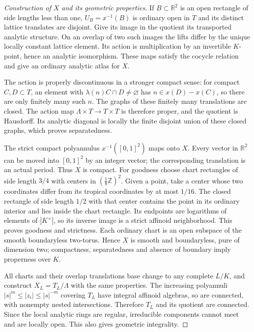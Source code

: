 \documentclass[11pt]{article}
\theoremstyle{remark}\newtheorem{remark}[theorem]{Remark}
\newcommand{\Z}{\mathbb Z}
\newcommand{\R}{\mathbb R}
\begin{document}
\begin{proof}[Construction of $X$ and its geometric properties]
If $B\subset\R^2$ is an open rectangle of side lengths less than one,
$U_B=x^{-1}(B)$ is ordinary open in $T$ and its distinct lattice translates
are disjoint. Give its image in the quotient its transported analytic
structure. On an overlap of two such images the lifts differ by the
unique locally constant lattice element. Its action is multiplication
by an invertible $K$-point, hence an analytic isomorphism. These maps
satisfy the cocycle relation and give an ordinary analytic atlas for $X$.

The action is properly discontinuous in a stronger compact sense:
for compact $C,D\subset T$, an element with $\lambda(n)C\cap D\ne\varnothing$
has $n\in x(D)-x(C)$, so there are only finitely many such $n$.
The graphs of these finitely many translations are closed. The action
map $\Lambda\times T\to T\times T$ is therefore proper, and the quotient
is Hausdorff. Its analytic diagonal is locally the finite disjoint union
of these closed graphs, which proves separatedness.

The strict compact polyannulus $x^{-1}([0,1]^2)$ maps onto $X$.
Every vector in $\R^2$ can be moved into $[0,1]^2$ by an integer vector;
the corresponding translation is an actual period. Thus $X$ is compact.
For goodness choose chart rectangles of side length $3/4$ with centers
in $(\tfrac18\Z)^2$. Given a point, take a center whose two coordinates
differ from its tropical coordinates by at most $1/16$. The closed
rectangle of side length $1/2$ with that center contains the point in
its ordinary interior and lies inside the chart rectangle. Its endpoints
are logarithms of elements of $|K^\times|$, so its inverse image is a
strict affinoid neighborhood. This proves goodness and strictness. Each
ordinary chart is an open subspace of the smooth boundaryless two-torus.
Hence $X$ is smooth and boundaryless, pure of dimension two; compactness,
separatedness and absence of boundary imply properness over $K$.

All charts and their overlap translations base change to any complete
$L/K$, and construct $X_L=T_L/\Lambda$ with the same properties. The
increasing polyannuli $|s|^m\le |z_i|\le |s|^{-m}$ covering $T_L$ have
integral affinoid algebras, so are connected, with nonempty nested
intersections. Therefore $T_L$ and its quotient are connected. Since
the local analytic rings are regular, irreducible components cannot
meet and are locally open. This also gives geometric integrality.
\end{proof}
\end{document}
